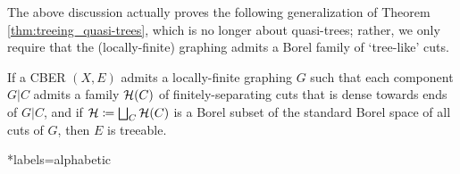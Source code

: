 \documentclass[reqno]{amsart}
\begin{document}
    The above discussion actually proves the following generalization of Theorem \ref{thm:treeing_quasi-trees}, which is no longer about quasi-trees; rather, we only require that the (locally-finite) graphing admits a Borel family of `tree-like' cuts.

    \begin{theorem}\label{thm:treeing_graphings_with_dense_cuts}
        If a CBER $(X,E)$ admits a locally-finite graphing $G$ such that each component $G|C$ admits a family $\mathcal{H}(C)$ of finitely-separating cuts that is dense towards ends of $G|C$, and if $\mathcal{H}\coloneqq\bigsqcup_C\mathcal{H}(C)$ is a Borel subset of the standard Borel space of all cuts of $G$, then $E$ is treeable.
    \end{theorem}


    \begin{bibdiv}
        \begin{biblist}*{labels={alphabetic}}
        \end{biblist}
    \end{bibdiv}
\end{document}

